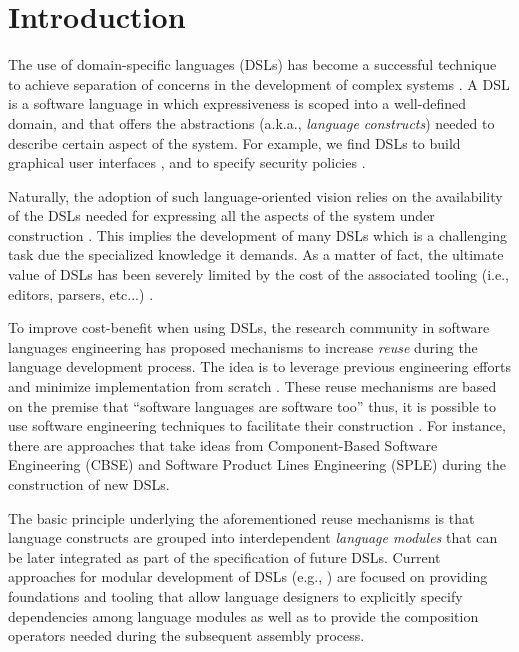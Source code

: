 \section{Introduction}
\label{sec:introduction}

The use of domain-specific languages (DSLs) has become a successful technique to achieve separation of concerns in the development of complex systems \cite{Cook:2006}. A DSL is a software language in which expressiveness is scoped into a well-defined domain, and that offers the abstractions (a.k.a., \textit{language constructs}) needed to describe certain aspect of the system. For example, we find DSLs to build graphical user interfaces \cite{Oney:2012}, and to specify security policies \cite{Lodderstedt:2002}.

Naturally, the adoption of such language-oriented vision relies on the availability of the DSLs needed for expressing all the aspects of the system under construction \cite{Clark:2013}. This implies the development of many DSLs which is a challenging task due the specialized knowledge it demands. \iffalse A language designer must own not only quite solid modeling skills but also the technical expertise for conducting the definition of specific artifacts such as grammars, metamodels, compilers, and interpreters.\fi  As a matter of fact, the ultimate value of DSLs has been severely limited by the cost of the associated tooling (i.e., editors, parsers, etc...) \cite{jezequel:2014}.

To improve cost-benefit when using DSLs, the research community in software languages engineering has proposed mechanisms to increase \textit{reuse} during the language development process. The idea is to leverage previous engineering efforts and minimize implementation from scratch \cite{Storm:2013}. These reuse mechanisms are based on the premise that ``software languages are software too'' \cite{Favre:2011} thus, it is possible to use software engineering techniques to facilitate their construction \cite{Kleppe:2009}. For instance, there are approaches that take ideas from Component-Based Software Engineering (CBSE) \cite{Cleenewerck:2003} and Software Product Lines Engineering (SPLE) \cite{Zschaler:2010} during the construction of new DSLs.

The basic principle underlying the aforementioned reuse mechanisms is that language constructs are grouped into interdependent \textit{language modules} that can be later integrated as part of the specification of future DSLs. Current approaches for modular development of DSLs (e.g., \cite{Mernik:2013,Rumpe:2010,Voelter:2013b}) are focused on providing foundations and tooling that allow language designers to explicitly specify dependencies among language modules as well as to provide the composition operators needed during the subsequent assembly process.

